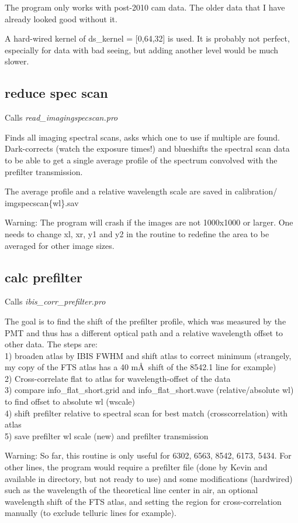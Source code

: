\documentclass[a4paper,12pt]{article}
\begin{document}
The program only works with post-2010 cam data. The older data that I have already looked good without it.

A hard-wired kernel of  ds\_kernel = [0,64,32] is used. It is probably not perfect, especially for data with bad seeing, but adding another level would be much slower.


\subsection{reduce spec scan}
Calls \textit{read\_imagingspecscan.pro}

Finds all imaging spectral scans, asks which one to use if multiple are found. Dark-corrects (watch the exposure times!) and blueshifts the spectral scan data to be able to get a single average profile of the spectrum convolved with the prefilter transmission.

The average profile and a relative wavelength scale are saved in calibration/ imgspecscan\{wl\}.sav

Warning: The program will crash if the images are not 1000x1000 or larger. One needs to change xl, xr, y1 and y2 in the routine to redefine the area to be averaged for other image sizes.

\subsection{calc prefilter}
Calls \textit{ibis\_corr\_prefilter.pro}

The goal is to find the shift of the prefilter profile, which was measured by the PMT and thus has a different optical path and a relative wavelength offset to other data. The steps are:\\
1) broaden atlas by IBIS FWHM and shift atlas to correct minimum (strangely, my copy of the FTS atlas has a 40 m\AA\ shift of the 8542.1 line for example)\\
2) Cross-correlate flat to atlas for wavelength-offset of the data\\
3) compare info\_flat\_short.grid and info\_flat\_short.wave (relative/absolute wl) to find offset to absolute wl (wscale)\\
4) shift prefilter relative to spectral scan for best match (crosscorrelation) with atlas\\
5) save prefilter wl scale (new) and prefilter transmission

Warning: So far, this routine is only useful for 6302, 6563, 8542, 6173, 5434. For other lines, the program would require a prefilter file (done by Kevin and available in directory, but not ready to use) and some modifications (hardwired) such as the wavelength of the theoretical line center in air, an optional wavelength shift of the FTS atlas, and setting the region for cross-correlation manually (to exclude telluric lines for example).
\end{document}
